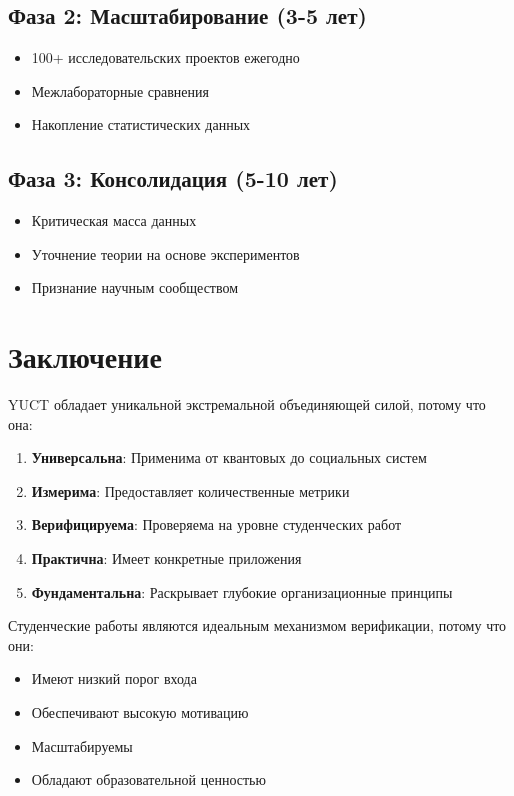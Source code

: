 \documentclass[12pt,a4paper]{article}
\begin{document}
	\subsection{Фаза 2: Масштабирование (3-5 лет)}
	\begin{itemize}
		\item 100+ исследовательских проектов ежегодно
		\item Межлабораторные сравнения
		\item Накопление статистических данных
	\end{itemize}
	
	\subsection{Фаза 3: Консолидация (5-10 лет)}
	\begin{itemize}
		\item Критическая масса данных
		\item Уточнение теории на основе экспериментов
		\item Признание научным сообществом
	\end{itemize}
	
	\section{Заключение}
	
	YUCT обладает уникальной экстремальной объединяющей силой, потому что она:
	\begin{enumerate}
		\item \textbf{Универсальна}: Применима от квантовых до социальных систем
		\item \textbf{Измерима}: Предоставляет количественные метрики
		\item \textbf{Верифицируема}: Проверяема на уровне студенческих работ
		\item \textbf{Практична}: Имеет конкретные приложения
		\item \textbf{Фундаментальна}: Раскрывает глубокие организационные принципы
	\end{enumerate}
	
	Студенческие работы являются идеальным механизмом верификации, потому что они:
	\begin{itemize}
		\item Имеют низкий порог входа
		\item Обеспечивают высокую мотивацию
		\item Масштабируемы
		\item Обладают образовательной ценностью
	\end{itemize}
	
\end{document}
